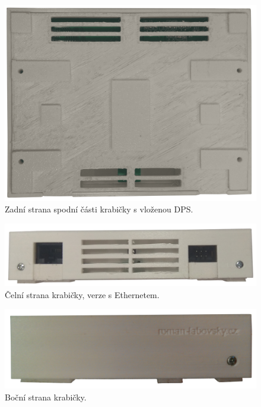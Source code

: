 \begin{figure}[H]
    \centering
    \includegraphics[width=\textwidth]{images/krabicka-nastenny-snimac-prostorove-teploty/krabicka-nastenny-snimac-prostorove-teploty-spodni-cast-zezadu-dps.png}
    \caption{Zadní strana spodní části krabičky s vloženou DPS.}
    \label{fig:krabicka-nastenny-snimac-prostorove-teploty-spodni-cast-zezadu-dps}
\end{figure}

\begin{figure}[H]
    \centering
    \includegraphics[width=\textwidth]{images/krabicka-nastenny-snimac-prostorove-teploty/krabicka-nastenny-snimac-prostorove-teploty-ethernet-celni-strana.png}
    \caption{Čelní strana krabičky, verze s Ethernetem.}
    \label{fig:krabicka-nastenny-snimac-prostorove-teploty-ethernet-spodni-cast-zezadu}
\end{figure}

\begin{figure}[H]
    \centering
    \includegraphics[width=\textwidth]{images/krabicka-nastenny-snimac-prostorove-teploty/krabicka-nastenny-snimac-prostorove-teploty-bocni-strana.png}
    \caption{Boční strana krabičky.}
    \label{fig:krabicka-nastenny-snimac-prostorove-teploty-prava-strana}
\end{figure}

